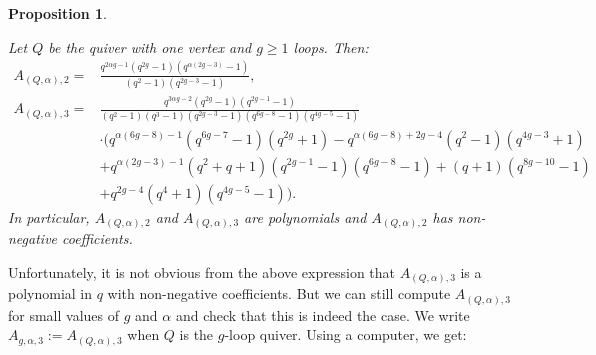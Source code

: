 \documentclass[11pt,english]{article}
\numberwithin{equation}{section}
\numberwithin{figure}{section}
\theoremstyle{definition}
\theoremstyle{plain}
\newtheorem{prop}[df]{Proposition}
\theoremstyle{remark}
\begin{document}
\begin{prop} \label{Prop/KacPolHuaFml}

Let $Q$ be the quiver with one vertex and $g\geq1$ loops. Then:\[
\begin{split}
A_{(Q,\alpha),2}= & \frac{q^{2\alpha g-1}(q^{2g}-1)(q^{\alpha(2g-3)}-1)}{(q^2-1)(q^{2g-3}-1)}, \\
A_{(Q,\alpha),3}= &
\frac{q^{3\alpha g-2}(q^{2g}-1)(q^{2g-1}-1)}{(q^2-1)(q^3-1)(q^{2g-3}-1)(q^{6g-8}-1)(q^{4g-5}-1)} \\
 & \cdot
\big(
q^{\alpha(6g-8)-1}(q^{6g-7}-1)(q^{2g}+1)
-q^{\alpha(6g-8)+2g-4}(q^2-1)(q^{4g-3}+1) \\
 & +q^{\alpha(2g-3)-1}(q^2+q+1)(q^{2g-1}-1)(q^{6g-8}-1)+(q+1)(q^{8g-10}-1) \\
 & +q^{2g-4}(q^4+1)(q^{4g-5}-1) \big)
.
\end{split}
\]In particular, $A_{(Q,\alpha),2}$ and $A_{(Q,\alpha),3}$ are polynomials
and $A_{(Q,\alpha),2}$ has non-negative coefficients.

\end{prop}

Unfortunately, it is not obvious from the above expression that $A_{(Q,\alpha),3}$
is a polynomial in $q$ with non-negative coefficients. But we can
still compute $A_{(Q,\alpha),3}$ for small values of $g$ and $\alpha$
and check that this is indeed the case. We write $A_{g,\alpha,3}:=A_{(Q,\alpha),3}$
when $Q$ is the $g$-loop quiver. Using a computer, we get:
\end{document}
